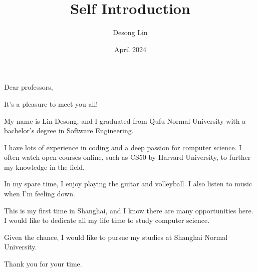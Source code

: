 \documentclass{article}
\title{\fontsize{18}{19}\selectfont Self Introduction}
\author{Desong Lin}
\date{April 2024}
\begin{document}
\maketitle
\fontsize{13}{15}\selectfont
Dear professors,

It's a pleasure to meet you all!

My name is Lin Desong, and I graduated from Qufu Normal University with a bachelor's degree in Software Engineering.

I have lots of experience in coding and a deep passion for computer science. I often watch open courses online, such as CS50 by Harvard University, to further my knowledge in the field.

In my spare time, I enjoy playing the guitar and volleyball. I also listen to music when I'm feeling down.

This is my first time in Shanghai, and I know there are many opportunities here. I would like to dedicate all my life time to study computer science.

Given the chance, I would like to pursue my studies at Shanghai Normal University.

Thank you for your time.
\end{document}
